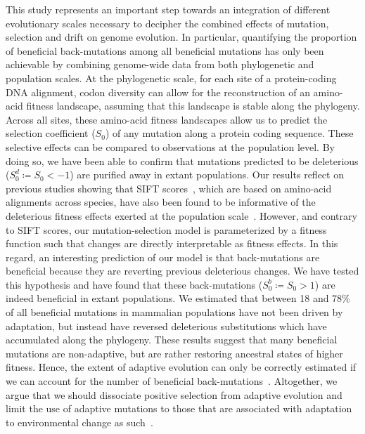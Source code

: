 \documentclass{article}
\newcommand{\Sphy}{S_{0}}
\newcommand{\SphyDel}{\Sphy^{d}}
\newcommand{\SphyBen}{\Sphy^{b}}
\begin{document}
    This study represents an important step towards an integration of different evolutionary scales necessary to decipher the combined effects of mutation, selection and drift on genome evolution.
    In particular, quantifying the proportion of beneficial back-mutations among all beneficial mutations has only been achievable by combining genome-wide data from both phylogenetic and population scales.
    At the phylogenetic scale, for each site of a protein-coding DNA alignment, codon diversity can allow for the reconstruction of an amino-acid fitness landscape, assuming that this landscape is stable along the phylogeny.
    Across all sites, these amino-acid fitness landscapes allow us to predict the selection coefficient ($\Sphy$) of any mutation along a protein coding sequence.
    These selective effects can be compared to observations at the population level.
    By doing so, we have been able to confirm that mutations predicted to be deleterious ($\SphyDel \coloneqq \Sphy < -1$) are purified away in extant populations.
    Our results reflect on previous studies showing that SIFT scores~\cite{ng_sift_2003, vaser_sift_2016}, which are based on amino-acid alignments across species, have also been found to be informative of the deleterious fitness effects exerted at the population scale~\cite{chen_hunting_2021}.
    However, and contrary to SIFT scores, our mutation-selection model is parameterized by a fitness function such that changes are directly interpretable as fitness effects.
    In this regard, an interesting prediction of our model is that back-mutations are beneficial because they are reverting previous deleterious changes.
    We have tested this hypothesis and have found that these back-mutations ($\SphyBen \coloneqq \Sphy > 1 $) are indeed beneficial in extant populations.
    We estimated that between 18 and 78\% of all beneficial mutations in mammalian populations have not been driven by adaptation, but instead have reversed deleterious substitutions which have accumulated along the phylogeny.
    These results suggest that many beneficial mutations are non-adaptive, but are rather restoring ancestral states of higher fitness.
    Hence, the extent of adaptive evolution can only be correctly estimated if we can account for the number of beneficial back-mutations~\cite{keightley_what_2010, rice_evolutionarily_2015}.
    Altogether, we argue that we should dissociate positive selection from adaptive evolution and limit the use of adaptive mutations to those that are associated with adaptation to environmental change as such~\cite{charlesworth_other_2007, mustonen_fitness_2009}.
\end{document}
